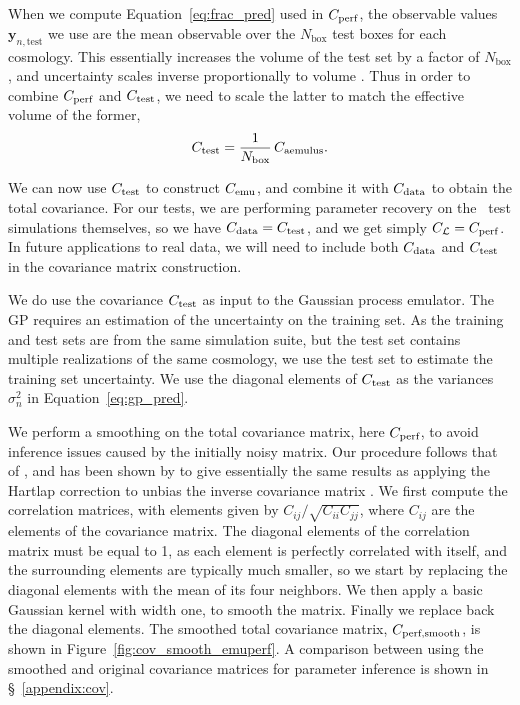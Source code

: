 When we compute Equation~\eqref{eq:frac_pred} used in $C_\text{perf}$, the observable values $\bm{y}_{n,\mathrm{test}}$ we use are the mean observable over the $N_\mathrm{box}$ test boxes for each cosmology.
This essentially increases the volume of the test set by a factor of $N_\mathrm{box}$, and uncertainty scales inverse proportionally to volume \citep{KlypinPrada2018}.
Thus in order to combine $C_\text{perf}$ and $C_\text{test}$, we need to scale the latter to match the effective volume of the former,
\begin{equation}
    C_\text{test} = \frac{1}{N_\mathrm{box}} \, C_\text{aemulus} .
\end{equation}

We can now use $C_\text{test}$ to construct $C_\text{emu}$, and combine it with $C_\text{data}$ to obtain the total covariance.
For our tests, we are performing parameter recovery on the \aemulus\ test simulations themselves, so we have $C_\text{data} = C_\text{test}$, and we get simply $C_{\mathcal{L}} = C_\text{perf}$.
In future applications to real data, we will need to include both $C_\text{data}$ and $C_\text{test}$ in the covariance matrix construction.

We do use the \aemulus covariance $C_\text{test}$ as input to the Gaussian process emulator.
The GP requires an estimation of the uncertainty on the training set.
As the training and test sets are from the same simulation suite, but the test set contains multiple realizations of the same cosmology, we use the test set to estimate the training set uncertainty.
We use the diagonal elements of $C_\text{test}$ as the variances $\sigma_n^2$ in Equation~\eqref{eq:gp_pred}.

We perform a smoothing on the total covariance matrix, here $C_\text{perf}$, to avoid inference issues caused by the initially noisy matrix.
Our procedure follows that of \cite{Lange2022}, and has been shown by \cite{Mandelbaum2013} to give essentially the same results as applying the Hartlap correction to unbias the inverse covariance matrix \citep{Hartlap2007}.
We first compute the correlation matrices, with elements given by $C_{ij}/\sqrt{C_{ii}C_{jj}}$, where $C_{ij}$ are the elements of the covariance matrix.
The diagonal elements of the correlation matrix must be equal to 1, as each element is perfectly correlated with itself, and the surrounding elements are typically much smaller, so we start by replacing the diagonal elements with the mean of its four neighbors.
We then apply a basic Gaussian kernel with width one, to smooth the matrix.
Finally we replace back the diagonal elements.
The smoothed total covariance matrix, $C_\text{perf,smooth}$, is shown in Figure~\ref{fig:cov_smooth_emuperf}.
A comparison between using the smoothed and original covariance matrices for parameter inference is shown in \S~\ref{appendix:cov}.


